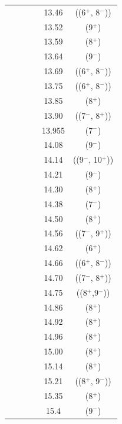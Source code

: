 {\begin{center}
\begin{longtable}{cc cc cc}
  &   &   &   & 13.46 & ((6$^+$, 8$^-$))          \\
  &   &   &   & 13.52 & (9$^+$)                   \\
  &   &   &   & 13.59 & (8$^+$)                   \\
  &   &   &   & 13.64 & (9$^-$)                   \\
  &   &   &   & 13.69 & ((6$^+$, 8$^-$))          \\
  &   &   &   & 13.75 & ((6$^+$, 8$^-$))          \\
  &   &   &   & 13.85 & (8$^+$)                   \\
  &   &   &   & 13.90 & ((7$^-$, 8$^+$))          \\
  &   &   &   & 13.955  & (7$^-$)                   \\
  &   &   &   & 14.08 &   (9$^-$)                 \\
  &   &   &   & 14.14 &   ((9$^-$, 10$^+$))       \\
  &   &   &   & 14.21 &   (9$^-$)                 \\
  &   &   &   & 14.30 &   (8$^+$)                 \\
  &   &   &   & 14.38 &   (7$^-$)                 \\
  &   &   &   & 14.50 &   (8$^+$)                 \\
  &   &   &   & 14.56 &   ((7$^-$, 9$^+$))        \\
  &   &   &   & 14.62 &   (6$^+$)                 \\
  &   &   &   & 14.66 &   ((6$^+$, 8$^-$))        \\
  &   &   &   & 14.70 &   ((7$^-$, 8$^+$))        \\
  &   &   &   & 14.75 &   ((8$^+$,9$^-$))         \\
  &   &   &   & 14.86 &   (8$^+$)                 \\
  &   &   &   & 14.92 &   (8$^+$)                 \\
  &   &   &   & 14.96 &   (8$^+$)                 \\
  &   &   &   & 15.00 &   (8$^+$)                 \\
  &   &   &   & 15.14 &   (8$^+$)                 \\
  &   &   &   & 15.21 &   ((8$^+$, 9$^-$))        \\
  &   &   &   & 15.35 &   (8$^+$)                 \\
  &   &   &   & 15.4  &   (9$^-$)                 \\

\end{longtable}
\end{center}}
